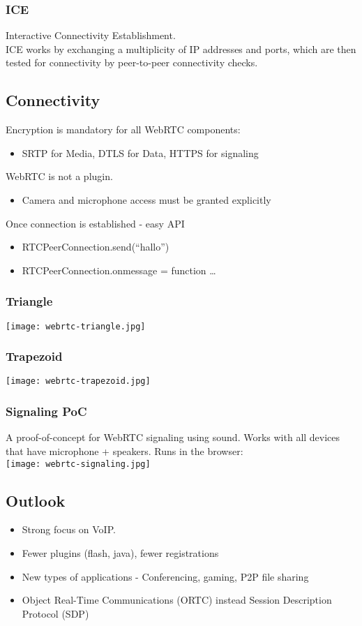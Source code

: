 \subsubsection{ICE}
Interactive Connectivity Establishment.\\
ICE works by exchanging a multiplicity of IP addresses and ports, which are then tested for connectivity by peer-to-peer connectivity checks.

\subsection{Connectivity}
Encryption is mandatory for all WebRTC components:
\begin{itemize}
  \item SRTP for Media, DTLS for Data, HTTPS for signaling
\end{itemize}
WebRTC is not a plugin.
\begin{itemize}
  \item Camera and microphone access must be granted explicitly
\end{itemize}
Once connection is established - easy API
\begin{itemize}
  \item RTCPeerConnection.send(``hallo'')
  \item RTCPeerConnection.onmessage = function \dots
\end{itemize}

\subsubsection{Triangle}
\texttt{[image: webrtc-triangle.jpg]}

\subsubsection{Trapezoid}
\texttt{[image: webrtc-trapezoid.jpg]}

\subsubsection{Signaling PoC}
A proof-of-concept for WebRTC signaling using sound. Works with all devices that have microphone + speakers. Runs in the browser:\\
\texttt{[image: webrtc-signaling.jpg]}

\subsection{Outlook}
\begin{itemize}
  \item Strong focus on VoIP.
  \item Fewer plugins (flash, java), fewer registrations
  \item New types of applications - Conferencing, gaming, P2P file sharing
  \item Object Real-Time Communications (ORTC) instead Session Description Protocol (SDP)
\end{itemize}
